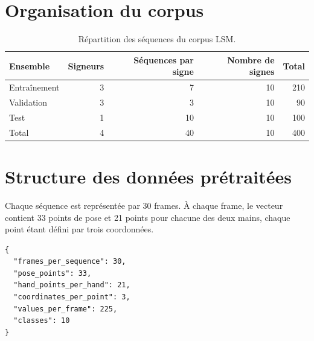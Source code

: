 \section{Organisation du corpus}

\begin{table}[ht]
\centering
\small
\caption{Répartition des séquences du corpus LSM.}
\label{tab:corpus-lsm-repartition}
\begin{tabular}{|l|r|r|r|r|}
\hline
Ensemble & Signeurs & Séquences par signe & Nombre de signes & Total \\
\hline
Entraînement & 3 & 7 & 10 & 210 \\
\hline
Validation & 3 & 3 & 10 & 90 \\
\hline
Test & 1 & 10 & 10 & 100 \\
\hline
Total & 4 & 40 & 10 & 400 \\
\hline
\end{tabular}
\end{table}

\section{Structure des données prétraitées}

Chaque séquence est représentée par 30 frames. À chaque frame, le vecteur
contient 33 points de pose et 21 points pour chacune des deux mains, chaque
point étant défini par trois coordonnées.

\begin{verbatim}
{
  "frames_per_sequence": 30,
  "pose_points": 33,
  "hand_points_per_hand": 21,
  "coordinates_per_point": 3,
  "values_per_frame": 225,
  "classes": 10
}
\end{verbatim}

\endinput
